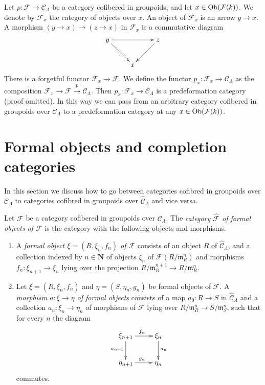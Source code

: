 \begin{remark}
\label{remark-localize-cofibered-groupoid}
Let $p: \mathcal{F} \to \mathcal{C}_\Lambda$ be a category cofibered in
groupoids, and let $x \in \mathop{\rm Ob}\nolimits(\mathcal{F}(k))$.  We denote by
$\mathcal{F}_x$ the category of objects over $x$.
An object of $\mathcal{F}_x$ is an arrow $y \to x$.
A morphism $(y \to x) \to (z \to x)$ in $\mathcal{F}_x$ is a commutative
diagram
$$
\xymatrix{
y \ar[rr] \ar[dr] & & z \ar[dl] \\
& x &
}
$$
There is a forgetful functor $\mathcal{F}_x \to \mathcal{F}$. We define
the functor $p_x : \mathcal{F}_x \to \mathcal{C}_\Lambda$ as the
composition
$\mathcal{F}_x \to \mathcal{F} \xrightarrow{p} \mathcal{C}_\Lambda$.
Then $p_x : \mathcal{F}_x \to \mathcal{C}_\Lambda$ is a
predeformation category (proof omitted). In this way we can pass from an
arbitrary category cofibered in groupoids over $\mathcal{C}_\Lambda$
to a predeformation category at any $x \in \mathop{\rm Ob}\nolimits(\mathcal{F}(k))$.
\end{remark}






\section{Formal objects and completion categories}
\label{section-formal-objects}

\noindent
In this section we discuss how to go between categories cofibred in
groupoids over $\mathcal{C}_\Lambda$ to categories cofibred in
groupoids over $\widehat{\mathcal{C}}_\Lambda$ and vice versa.

\begin{definition}
\label{definition-formal-objects}
Let $\mathcal{F}$ be a category cofibered in groupoids over
$\mathcal{C}_\Lambda$. The {\it category $\widehat{\mathcal{F}}$ of formal
objects of  $\mathcal{F}$} is the category with the following objects and
morphisms.
\begin{enumerate}
\item A {\it formal object $\xi = (R, \xi_n, f_n)$ of $\mathcal{F}$}
consists of an object $R$ of $\widehat{\mathcal{C}}_\Lambda$, and a collection
indexed by $n \in \mathbf{N}$ of objects $\xi_n$ of
$\mathcal{F}(R/\mathfrak m_R^n)$ and morphisms
$f_n : \xi_{n + 1} \to \xi_n$ lying over the projection
$R/\mathfrak m_R^{n + 1} \to R/\mathfrak m_R^n$.
\item Let $\xi = (R, \xi_n, f_n)$ and $\eta = (S, \eta_n, g_n)$ be
formal objects of $\mathcal{F}$.  A {\it morphism $a: \xi \to \eta$ of
formal objects} consists of a map $a_0 : R \to S$ in
$\widehat{\mathcal{C}}_\Lambda$ and a collection $a_n : \xi_n \to \eta_n$
of morphisms of $\mathcal{F}$ lying over
$R/\mathfrak m_R^n \to S/\mathfrak m_S^n$,
such that for every $n$ the diagram
$$
\xymatrix{
\xi_{n + 1} \ar[r]^{f_n} \ar[d]_{a_{n + 1}} & \xi_n \ar[d]^{a_n} \\
\eta_{n + 1} \ar[r]^{g_n} & \eta_n
}
$$
commutes.
\end{enumerate}
\end{definition}

